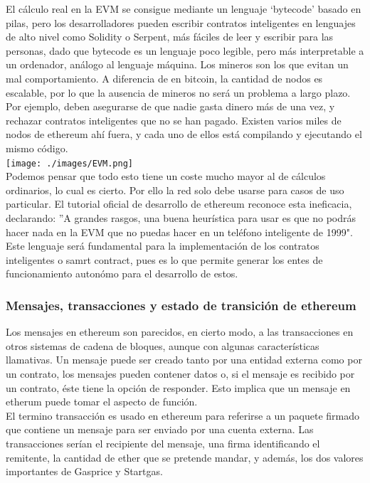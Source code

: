 \documentclass[11pt,a4paper]{article}
\begin{document}
El cálculo real en la EVM se consigue mediante un lenguaje ‘bytecode’ basado en pilas, pero los desarrolladores pueden escribir contratos inteligentes en lenguajes de alto nivel como Solidity o Serpent, más fáciles de leer y escribir para las personas, dado que bytecode es un lenguaje poco legible, pero más interpretable a un ordenador, análogo al lenguaje máquina. Los mineros son los que evitan un mal comportamiento. A diferencia de en bitcoin, la cantidad de nodos es escalable, por lo que la ausencia de mineros no será un problema a largo plazo. Por ejemplo, deben asegurarse de que
nadie gasta dinero más de una vez, y rechazar contratos inteligentes que no se han pagado. Existen varios miles de nodos de ethereum ahí fuera, y cada uno de ellos está compilando y ejecutando el mismo código.\\


\texttt{[image: ./images/EVM.png]}\\

Podemos pensar que todo esto tiene un coste mucho mayor al de cálculos ordinarios, lo cual es cierto. Por ello la red solo debe usarse para casos de uso particular. El tutorial oficial de desarrollo de ethereum reconoce esta ineficacia, declarando:
''A grandes rasgos, una buena heurística para usar es que no podrás hacer nada en la EVM que no puedas hacer en un teléfono inteligente de 1999".\\

Este lenguaje será fundamental para la implementación de los contratos inteligentes o samrt contract, pues es lo que permite generar los entes de funcionamiento autonómo para el desarrollo de estos.

\subsubsection{Mensajes, transacciones y estado de transición de ethereum}

Los mensajes en ethereum son parecidos, en cierto modo, a las transacciones en otros  sistemas de cadena de bloques, aunque con algunas características llamativas. Un mensaje puede ser creado tanto por una entidad externa como por un contrato, los mensajes pueden contener datos o, si el mensaje es recibido por un contrato, éste tiene la opción de responder. Esto implica que un mensaje en etherum puede tomar el aspecto de función.\\

El termino transacción es usado en ethereum para referirse a un paquete firmado que contiene un mensaje para ser enviado por una cuenta externa. Las transacciones serían el recipiente del mensaje, una firma identificando el remitente, la cantidad de ether que se pretende mandar, y además, los dos valores importantes de Gasprice y Startgas.\\
\end{document}

